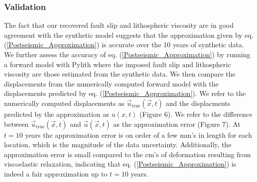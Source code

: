 \documentclass[extra,mreferee]{gji}
\begin{document}

\subsubsection{Validation}
The fact that our recovered fault slip and lithospheric viscosity are
in good agreement with the synthetic model suggests that the
approximation given by eq. (\ref{Postseismic_Approximation}) is
accurate over the 10 years of synthetic data.  We further assess the accuracy
of eq. (\ref{Postseismic_Approximation}) by running a forward model
with Pylith where the imposed fault slip and lithospheric viscosity
are those estimated from the synthetic data.  We then compare the
displacements from the numerically computed forward model with the
displacements predicted by eq. (\ref{Postseismic_Approximation}).  We
refer to the numerically computed displacements as
$\vec{u}_{\mathrm{true}}(\vec{x},t)$ and the displacments predicted by the
approximation as $u(x,t)$ (Figure 6).  We refer to the
difference between $\vec{u}_{\mathrm{true}}(\vec{x},t)$ and $\vec{u}(\vec{x},t)$
as the approximation error (Figure 7). At $t=10$ years the
approximation error is on order of a few mm's in length for each
location, which is the magnitude of the data uncertainty.
Additionally, the approximation error is small compared to the
cm's of deformation resulting from viscoelastic relaxation, indicating
that eq. (\ref{Postseismic_Approximation}) is indeed a fair
approximation up to $t=10$ years.  
\end{document}
